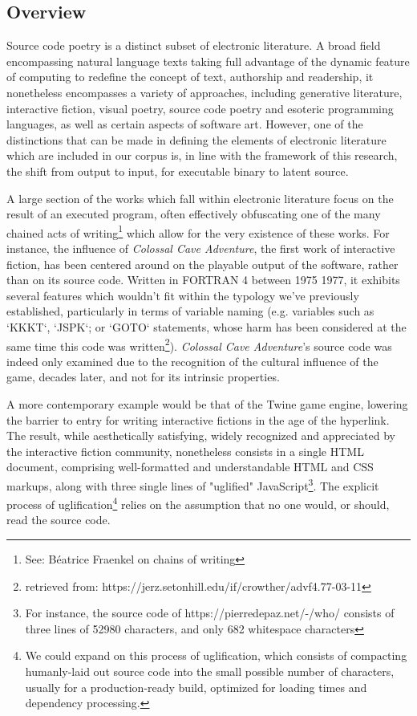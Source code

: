 \documentclass{article}
\begin{document}
\subsection{Overview}

Source code poetry is a distinct subset of electronic literature. A broad field encompassing natural language texts taking full advantage of the dynamic feature of computing to redefine the concept of text, authorship and readership, it nonetheless encompasses a variety of approaches, including generative literature, interactive fiction, visual poetry, source code poetry and esoteric programming languages, as well as certain aspects of software art. However, one of the distinctions that can be made in defining the elements of electronic literature which are included in our corpus is, in line with the framework of this research, the shift from output to input, for executable binary to latent source.

A large section of the works which fall within electronic literature focus on the result of an executed program, often effectively obfuscating one of the many chained acts of writing\footnote{See: Béatrice Fraenkel on chains of writing} which allow for the very existence of these works. For instance, the influence of \emph{Colossal Cave Adventure}\cite{crowthers_colossal_1977}, the first work of interactive fiction, has been centered around on the playable output of the software, rather than on its source code. Written in FORTRAN 4 between 1975 1977, it exhibits several features which wouldn't fit within the typology we've previously established, particularly in terms of variable naming (e.g. variables such as `KKKT`, `JSPK`; or `GOTO` statements, whose harm has been considered at the same time this code was written\footnote{retrieved from: https://jerz.setonhill.edu/if/crowther/advf4.77-03-11}). \emph{Colossal Cave Adventure}'s source code was indeed only examined due to the recognition of the cultural influence of the game, decades later, and not for its intrinsic properties.

A more contemporary example would be that of the Twine game engine, lowering the barrier to entry for writing interactive fictions in the age of the hyperlink. The result, while aesthetically satisfying, widely recognized and appreciated by the interactive fiction community, nonetheless consists in a single HTML document, comprising well-formatted and understandable HTML and CSS markups, along with three single lines of "uglified" JavaScript\footnote{For instance, the source code of https://pierredepaz.net/-/who/ consists of three lines of 52980 characters, and only 682 whitespace characters}. The explicit process of uglification\footnote{We could expand on this process of uglification, which consists of compacting humanly-laid out source code into the small possible number of characters, usually for a production-ready build, optimized for loading times and dependency processing.} relies on the assumption that no one would, or should, read the source code.
\end{document}

